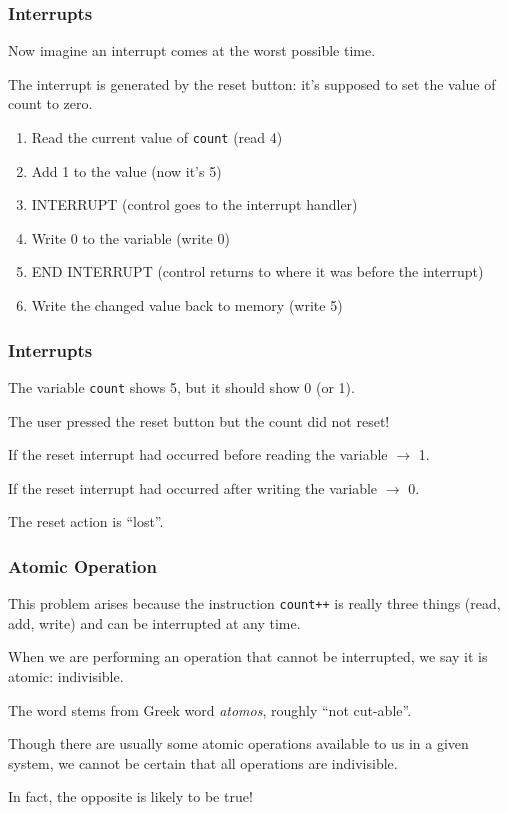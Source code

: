 \begin{frame}
	\frametitle{Interrupts}

	Now imagine an interrupt comes at the worst possible time.

	The interrupt is generated by the reset button: it's supposed to set the value of count to zero.

	\begin{enumerate}
		\item Read the current value of \texttt{count} (read 4)
		\item Add 1 to the value (now it's 5)
		\item INTERRUPT (control goes to the interrupt handler)
		\item Write 0 to the variable (write 0)
		\item END INTERRUPT (control returns to where it was before the interrupt)
		\item Write the changed value back to memory (write 5)
	\end{enumerate}

\end{frame}

\begin{frame}
	\frametitle{Interrupts}

	The variable \texttt{count} shows 5, but it should show 0 (or 1).

	The user pressed the reset button but the count did not reset!

	If the reset interrupt had occurred before reading the variable $\rightarrow$ 1.

	If the reset interrupt had occurred after writing the variable $\rightarrow$ 0.

	The reset action is ``lost''.

\end{frame}

\begin{frame}
	\frametitle{Atomic Operation}

	This problem arises because the instruction \texttt{count++} is really three things (read, add, write) and can be interrupted at any time.

	When we are performing an operation that cannot be interrupted, we say it is \alert{atomic}: indivisible.

	The word stems from Greek word \textit{atomos}, roughly ``not cut-able''.

	Though there are usually some atomic operations available to us in a given system, we cannot be certain that all operations are indivisible.

	In fact, the opposite is likely to be true!

\end{frame}

